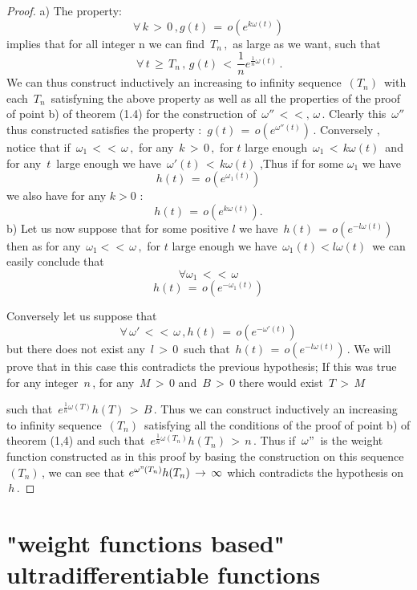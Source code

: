 \documentclass[12pt,a4paper]{amsart}
\begin{document}
\begin{proof}
a) The property: 
$$ \,\forall\,k\,>\,0\,, g(t)\,=\,o(e^{k\omega(t)})\,$$
implies that for all integer n we can find $\,T_n\, ,$
as large as we want, such that 
$$\,\forall \,t\,\geq\,T_n\,,\,g(t)\,
<\,\frac{1}{n}e^{\frac{1}{n}\omega(t)}\,.$$
We can thus construct inductively an increasing to infinity sequence $\,(T_n)\,$ with each 
$\,T_n\,$ satisfyning the above property as well as all the properties of the proof of point b) of theorem (1.4) for the construction of $\,\omega''\,<<,\,\omega\,.$
Clearly this $\,\omega'' \,$ thus constructed satisfies
the property :
$\,g(t)\,=\,o(e^{\omega''(t)})\,.$
Conversely , notice that if $\,\omega_1\,<<\,\omega\,,$
for any $\,k\,>\,0\,,$ for $t$ large enough
 $ \,\omega_1\,<\,k\omega(t)\,$ and for any $\,t\,$ large enough we have  $\,\omega'(t)\,<\,k\omega(t)$ ,Thus if for some $\omega_1 $ we have 
 $$ h(t) \,=\,o(e^{\omega_1(t)})$$   we also have 
 for any $k>0$ :
 $$ h(t) \,=\,o(e^{k\omega(t)}).$$
 b) Let us now suppose that for some positive $l$ we have
 $ \,h(t) \,=\,o(e^{-l\omega(t)})$ then as for any 
 $\,\omega_1 <<\,\omega\,,$ for $t$ large enough we have 
 $\,\omega_1(t) <l\omega(t)\,$ we can easily conclude that 
 $$ \,\forall \omega_1\,<<\,\omega\,$$
 $$\, h(t) \,=\,o(e^{-\omega_1(t)})\,$$

   
 Conversely let us suppose that 
 $$ \,\forall\,\omega'\,<<\,\omega\,
 ,h(t)\,=\,o(e^{-\omega'(t)})\,$$ 
but there does not exist any $\,l\,>\,0\,$ such that 
$\,h(t)\,=\,o(e^{-l\omega(t)})\,.$
We will prove that in this case this contradicts the previous hypothesis;
If this was true for any integer $\,n\,$, for any $\,M\,>\,0$ and $\,B\,>\,0$ there would exist $\,T\,>\,M\,$

such that 
$\,e^{\frac{1}{n}\omega(T)}h(T)\,>\,B\,.$
Thus we can construct inductively an increasing to infinity sequence $\,(T_n)\,$  satisfying all the conditions of the proof of point b) of theorem (1,4) and such that $\,e^{\frac{1}{n}\omega(T_n)}h(T_n)\,>\,n\,$. 
Thus if $\,\omega"\,$ is the weight function constructed as in this proof by basing the construction on this sequence
 $\,(T_n)\,$,
  we can see that
 $e^{\omega"(T_n)}h(T_n) \,\rightarrow\,\infty$
 which contradicts the hypothesis on $\,h\,$.

\end{proof}

\section{"weight functions based" ultradifferentiable functions}
\end{document}
